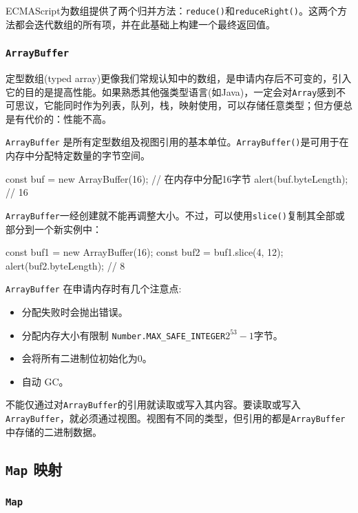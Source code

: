 ECMAScript为数组提供了两个归并方法：\texttt{reduce()}和\texttt{reduceRight()}。这两个方法都会迭代数组的所有项，并在此基础上构建一个最终返回值。

\subsubsection{\texttt{ArrayBuffer}}

定型数组(typed array)更像我们常规认知中的数组，是申请内存后不可变的，引入它的目的是提高性能。如果熟悉其他强类型语言(如Java)，一定会对\texttt{Array}感到不可思议，它能同时作为列表，队列，栈，映射使用，可以存储任意类型；但方便总是有代价的：性能不高。

\texttt{ArrayBuffer} 是所有定型数组及视图引用的基本单位。\texttt{ArrayBuffer()}是可用于在内存中分配特定数量的字节空间。

\begin{JavaScript}
const buf = new ArrayBuffer(16);  // 在内存中分配16字节
alert(buf.byteLength);            // 16 
\end{JavaScript}

\texttt{ArrayBuffer}一经创建就不能再调整大小。不过，可以使用\texttt{slice()}复制其全部或部分到一个新实例中：

\begin{JavaScript}
const buf1 = new ArrayBuffer(16); 
const buf2 = buf1.slice(4, 12); 
alert(buf2.byteLength);  // 8
\end{JavaScript}

\texttt{ArrayBuffer} 在申请内存时有几个注意点: 
\begin{itemize}
    \item 分配失败时会抛出错误。
    \item 分配内存大小有限制 \texttt{Number.MAX\_SAFE\_INTEGER$2^{53}-1$}字节。
    \item 会将所有二进制位初始化为0。
    \item 自动 GC。
\end{itemize}

不能仅通过对\texttt{ArrayBuffer}的引用就读取或写入其内容。要读取或写入\texttt{ArrayBuffer}，就必须通过视图。视图有不同的类型，但引用的都是\texttt{ArrayBuffer}中存储的二进制数据。

\subsection{\texttt{Map} 映射}

\subsubsection{\texttt{Map}}

